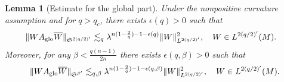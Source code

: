 \documentclass[12pt,reqno,a4paper]{amsart}
\newcommand\eps{\epsilon}
\newtheorem{lemma}[theorem]{Lemma}
\begin{document}
\begin{lemma}[Estimate for the global part]
Under the nonpositive curvature assumption and for $q>q_c$, there exists $\eps(q)>0$ such that
  \begin{align}\label{Aglo at s' with power gain}
    \|WA_{\rm glo}\overline{W}\|_{\mathfrak{S}^{2(q/2)'}}&\lesssim_{q}\lambda^{n(1-\frac{2}{q})-1-\eps(q)}\|W\|^2_{L^{2(q/2)'}} ,\quad W\in L^{2(q/2)'}(M).
  \end{align}
Moreover, for any $\beta<\frac{q(n-1)}{2n}$ there exists $\eps(q,\beta)>0$ such that
    \begin{align}\label{Aglo final at alphaq}
    \|WA_{\rm glo}\overline{W}\|_{\mathfrak{S}^{\beta'}}
    \lesssim_{q,\beta}
    \lambda^{n(1-\frac{2}{q})-1-\eps(q,\beta)}
    \|W\|^2_{L^{2(q/2)'}} ,\quad W\in L^{2(q/2)'}(M).
  \end{align}
\end{lemma}
\end{document}
